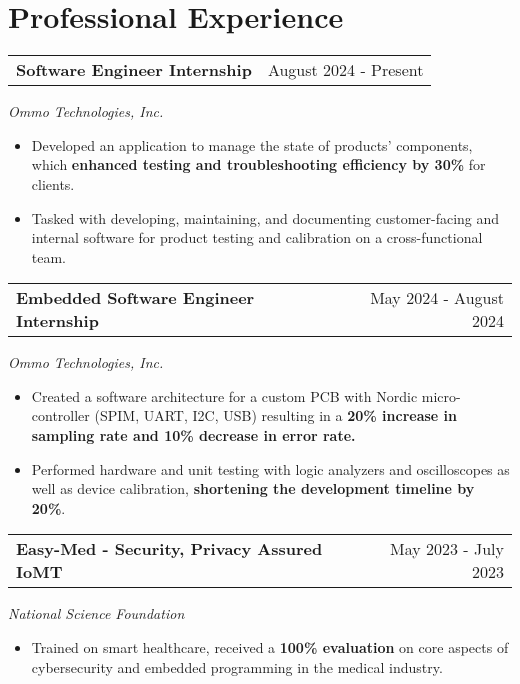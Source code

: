 \documentclass[a4paper,12pt]{article}
\begin{document}
\vspace{-0.7em}
\section{Professional Experience}

\begin{tabularx}{\linewidth}{@{}Xr@{}}
\textbf{Software Engineer Internship} & \hfill August 2024 - Present
\end{tabularx}
\textit{Ommo Technologies, Inc.}
\vspace{-0.4em}
\begin{itemize}[leftmargin=*, noitemsep, topsep=0pt]
    \item Developed an application to manage the state of products' components, which \textbf{enhanced testing and troubleshooting efficiency by 30\%} for clients.
    \item Tasked with developing, maintaining, and documenting customer-facing and internal software for product testing and calibration on a cross-functional team.
\end{itemize}

\begin{tabularx}{\linewidth}{@{}Xr@{}}
\textbf{Embedded Software Engineer Internship} & \hfill May 2024 - August 2024
\end{tabularx}
\textit{Ommo Technologies, Inc.}
\vspace{-0.4em}
\begin{itemize}[leftmargin=*, nosep]    
    \item Created a software architecture for a custom PCB with Nordic micro-controller (SPIM, UART, I2C, USB) resulting in a \textbf{20\% increase in sampling rate and 10\% decrease in error rate.}
    \item Performed hardware and unit testing with logic analyzers and oscilloscopes as well as device calibration, \textbf{shortening the development timeline by 20\%}.
\end{itemize}

\begin{tabularx}{\linewidth}{@{}Xr@{}}
\textbf{Easy-Med - Security, Privacy Assured IoMT} & \hfill May 2023 - July 2023
\end{tabularx}
\textit{National Science Foundation}
\vspace{-0.4em}
\begin{itemize}[leftmargin=*, nosep]
    \item Trained on smart healthcare, received a \textbf{100\% evaluation} on core aspects of cybersecurity and embedded programming in the medical industry.
\end{itemize}
\end{document}
